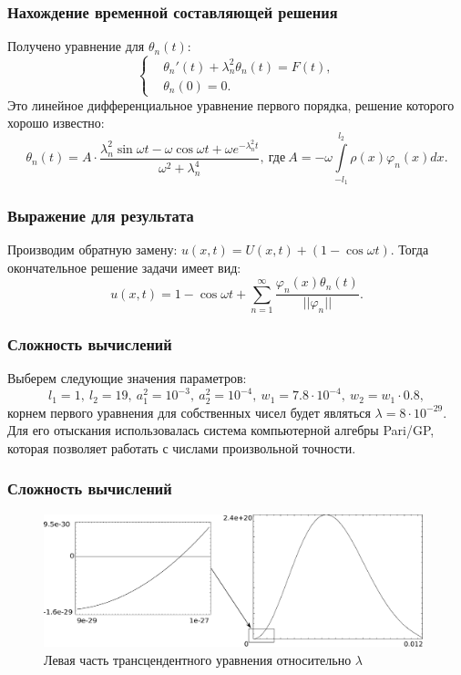 \documentclass[10pt,pdf,hyperref={unicode}]{beamer}
\begin{document}
\begin{frame}
  \frametitle{Нахождение временной составляющей решения}
  Получено уравнение для $\theta_n(t)$:
  \begin{equation*}
    \left\{  
    \begin{aligned}
      & \theta_n'(t) + \lambda_n^2 \theta_n(t) = F(t), \\
      & \theta_n (0) = 0.
    \end{aligned}
    \right.
  \end{equation*}
  Это линейное дифференциальное уравнение первого порядка, решение которого хорошо известно:
  \begin{equation*}
    \theta_n(t) = A\cdot\frac{\lambda_n^2 \sin \omega t - \omega \cos \omega t + \omega e^{-\lambda_n^2 t}}{\omega^2 + \lambda_n^4},\ \text{где}\ A=-\omega\int\limits_{-l_1}^{l_2}\rho(x)\varphi_n(x)dx.
  \end{equation*}
\end{frame}

\begin{frame}
  \frametitle{Выражение для результата}
    Производим обратную замену: $u(x,t) = U(x,t) + (1 - \cos \omega t)$. Тогда окончательное решение задачи имеет вид:
    \begin{equation*}
      u(x,t)= 1 - \cos \omega t + \sum \limits_{n=1}^{\infty} \frac{\varphi_n(x) \theta_n(t)}{||\varphi_n||}.
    \end{equation*}
\end{frame}

\begin{frame}
  \frametitle{Сложность вычислений}
    Выберем следующие значения параметров:
    \begin{equation*}
      l_1=1,\ l_2=19,\ a_1^2=10^{-3},\ a_2^2=10^{-4},\ w_1=7.8\cdot 10^{-4},\ w_2=w_1 \cdot 0.8,
    \end{equation*}
    корнем первого уравнения для собственных чисел будет являться $\lambda=8 \cdot 10^{-29}$.
    Для его отыскания использовалась система компьютерной алгебры Pari/GP, 
    которая позволяет работать с числами произвольной точности.
\end{frame}

\begin{frame}
  \frametitle{Сложность вычислений}
  \begin{figure}[H]
   \includegraphics[width=11cm]{full.eps}
   \caption{Левая часть трансцендентного уравнения относительно $\lambda$}
  \end{figure}
\end{frame}
\end{document}
